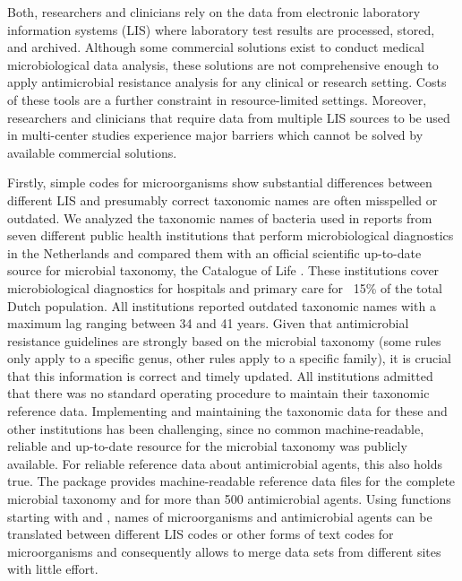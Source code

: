 \documentclass[article, shortnames]{jss}
\begin{document}
Both, researchers and clinicians rely on the data from electronic laboratory
information systems (LIS) where laboratory test results are processed,
stored, and archived.  Although some commercial solutions exist to conduct
medical microbiological data analysis, these solutions are not comprehensive
enough to apply antimicrobial resistance analysis for any clinical or
research setting.  Costs of these tools are a further constraint in
resource-limited settings.  Moreover, researchers and clinicians that
require data from multiple LIS sources to be used in multi-center studies
experience major barriers which cannot be solved by available commercial
solutions.

Firstly, simple codes for microorganisms show substantial differences
between different LIS and presumably correct taxonomic names are often
misspelled or outdated.  We analyzed the taxonomic names of bacteria used in
reports from seven different public health institutions that perform
microbiological diagnostics in the Netherlands and compared them with an
official scientific up-to-date source for microbial taxonomy, the Catalogue
of Life \citep{CoL-zq}.  These institutions cover microbiological
diagnostics for hospitals and primary care for ~15\% of the total Dutch
population.  All institutions reported outdated taxonomic names with a
maximum lag ranging between 34 and 41 years.  Given that antimicrobial
resistance guidelines are strongly based on the microbial taxonomy (some
rules only apply to a specific genus, other rules apply to a specific
family), it is crucial that this information is correct and timely updated. 
All institutions admitted that there was no standard operating procedure to
maintain their taxonomic reference data.  Implementing and maintaining the
taxonomic data for these and other institutions has been challenging, since
no common machine-readable, reliable and up-to-date resource for the
microbial taxonomy was publicly available.  For reliable reference data
about antimicrobial agents, this also holds true.  The  package
provides machine-readable reference data files for the complete microbial
taxonomy and for more than 500 antimicrobial agents.  Using functions
starting with  and , names of microorganisms and
antimicrobial agents can be translated between different LIS codes or other
forms of text codes for microorganisms and consequently allows to merge data
sets from different sites with little effort.
\end{document}
